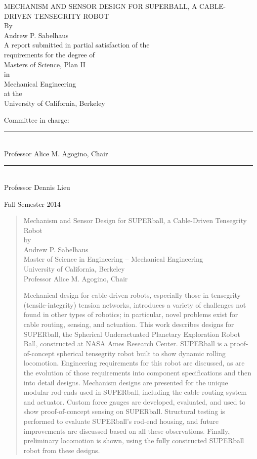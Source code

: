 \documentclass[12pt]{report}
\begin{document}
\begin{titlepage}
\begin{center}
\vspace{6cm}
{\large \uppercase{Mechanism and Sensor Design for SUPERball, a Cable-Driven Tensegrity Robot} \\[1.0cm]}
{By \\[0.5cm] \large Andrew P. Sabelhaus \\[1.5cm]}
{A report submitted in partial satisfaction of the \\[0.4cm]
requirements for the degree of \\[0.4cm]
Masters of Science, Plan II \\[0.4cm]
in \\[0.4cm]
Mechanical Engineering \\[0.4cm]
at the \\[0.4cm]
University of California, Berkeley \\[1.5cm]}
{Committee in charge: \\[1.5cm]
\rule{10cm}{0.4pt} \\
Professor Alice M. Agogino, Chair \\[1.5cm]
\rule{10cm}{0.4pt}\\
Professor Dennis Lieu}
\vfill
{\large Fall Semester 2014}
\end{center}
\end{titlepage}
\begin{abstract}
\thispagestyle{plain}
\begin{center}
Mechanism and Sensor Design for SUPERball, a Cable-Driven Tensegrity Robot \\
by \\
Andrew P. Sabelhaus\\
Master of Science in Engineering -- Mechanical Engineering \\
University of California, Berkeley \\
Professor Alice M. Agogino, Chair
\end{center}

Mechanical design for cable-driven robots, especially those in tensegrity (tensile-integrity) tension networks, introduces a variety of challenges not found in other types of robotics; in particular, novel problems exist for cable routing, sensing, and actuation.
This work describes designs for SUPERball, the Spherical Underactuated Planetary Exploration Robot Ball, constructed at NASA Ames Research Center.
SUPERball is a proof-of-concept spherical tensegrity robot built to show dynamic rolling locomotion.
Engineering requirements for this robot are discussed, as are the evolution of those requirements into component specifications and then into detail designs.
Mechanism designs are presented for the unique modular rod-ends used in SUPERball, including the cable routing system and actuator.
Custom force gauges are developed, evaluated, and used to show proof-of-concept sensing on SUPERball.
Structural testing is performed to evaluate SUPERball's rod-end housing, and future improvements are discussed based on all these observations.
Finally, preliminary locomotion is shown, using the fully constructed SUPERball robot from these designs.

\end{abstract}
\end{document}
